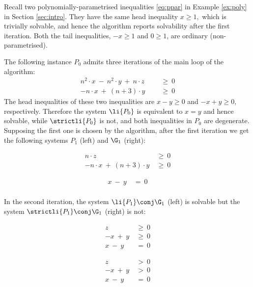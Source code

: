 \begin{slexample}
Recall two polynomially-parametrised inequalities \eqref{eq:ppar} in Example \ref{ex:poly}
in Section \ref{sec:intro}. They have the same head inequality
$
x\geq 1,
$
which is trivially solvable, and hence the algorithm reports solvability after the first iteration.
Both the tail inequalities,
$-x \geq 1$ and
$0 \geq 1$,
are ordinary (non-parametrised).

The following instance $P_0$ admits three iterations of the main loop of the algorithm:
\begin{align*}
n^2 \cdot x \ - \ n^2 \cdot y \  +  \ n \cdot z  & \ \geq \ 0 \\
-n \cdot x \ + \ (n+3) \cdot y \ \ \ \ \ \, & \ \geq \ 0
\end{align*}
The head inequalities of these two inequalities are $x-y \geq 0$ and $-x + y \geq 0$, respectively.
Therefore
the system $\li {P_0}$ is equivalent to $x=y$ and hence solvable, while $\strictli {P_0}$ is not,
and both inequalities in $P_0$ are degenerate.
Supposing the first one is chosen by the algorithm, after the first iteration we get the following systems $P_1$
(left) and $\G_1$ (right): 

\begin{minipage}{0.5\linewidth}
\begin{align*}
n \cdot z  & \ \geq \ 0\\
-n \cdot x \ + \ (n+3) \cdot y  & \ \geq \ 0
\end{align*}
\vspace{-2mm}
\end{minipage}
\begin{minipage}{0.5\linewidth}
\begin{align*}
x \ - \ y  & \ = \ 0 \\
\end{align*}
\vspace{-2mm}
\end{minipage}

\noindent
In the second iteration, 
the system $\li{P_1} \conj \G_1$ (left) is solvable but the system $\strictli{P_1} \conj \G_1$ (right) 
is not:

\begin{minipage}{0.5\linewidth}
\begin{align*}
z  & \ \geq \ 0\\
- x \ + \  y  & \ \geq \ 0 \\
x \ - \ y  & \ = \ 0 
\end{align*}
\vspace{-2mm}
\end{minipage}
\begin{minipage}{0.5\linewidth}
\begin{align*}
z  & \ > \ 0\\
- x \ + \  y  & \ > \ 0 \\
x \ - \ y  & \ = \ 0  
\end{align*}
\vspace{-2mm}
\end{minipage}


\end{slexample}
